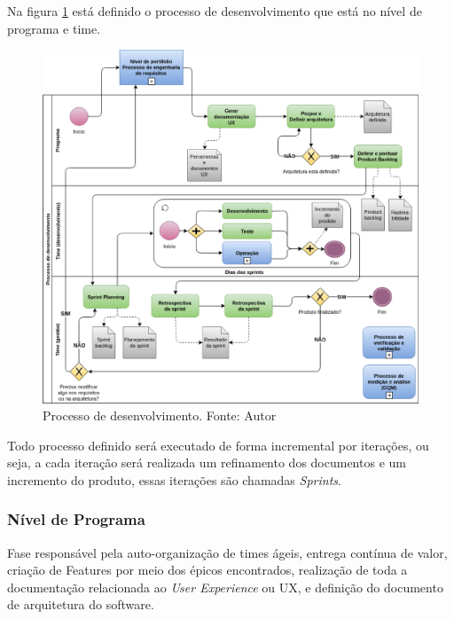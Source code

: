 Na figura \ref{fig:desenvolvimento} está definido o processo de desenvolvimento que está no nível de programa e time.

\begin{figure}[h!]
	\centering
  \includegraphics[keepaspectratio=true,scale=0.5]{figuras/desenvolvimento.eps}
  \caption[Processo de desenvolvimento.]{Processo de desenvolvimento. Fonte: Autor}
	\label{fig:desenvolvimento}
\end{figure}

Todo processo definido será executado de forma incremental por iterações, ou seja, a cada iteração será realizada um
refinamento dos documentos e um incremento do produto, essas iterações são chamadas \textit{Sprints}.

\subsubsection{Nível de Programa}

Fase responsável pela auto-organização de times ágeis, entrega contínua de valor, criação de Features por meio dos épicos encontrados, realização de toda a documentação relacionada ao \textit{User Experience} ou UX, e definição do documento de arquitetura do software.

